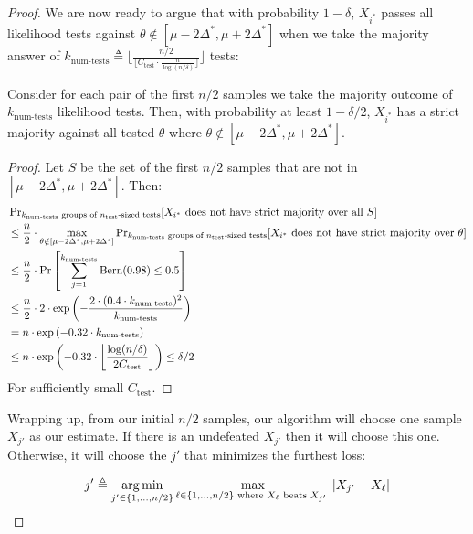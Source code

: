 \begin{proof}
We are now ready to argue that with probability $1-\delta$, $X_{i^*}$ passes all likelihood tests against $\theta \notin [\mu-2\Delta^*,\mu+2\Delta^*]$ when we take the majority answer of $k_{\textrm{num-tests}} \triangleq \lfloor \frac{n/2}{\lfloor C_{\textrm{test}} \cdot \frac{n}{\log(n/\delta)} \rfloor} \rfloor$ tests:

\begin{claim}\label{claim:majority-good}
    Consider for each pair of the first $n/2$ samples we take the majority outcome of $k_{\textrm{num-tests}}$ likelihood tests. Then, with probability at least $1-\delta/2$, $X_{i^*}$ has a strict majority against all tested $\theta$ where $\theta \notin [\mu - 2 \Delta^*, \mu + 2 \Delta^*]$. 
\end{claim}
\begin{proof}
    Let $S$ be the set of the first $n/2$ samples that are not in $[\mu - 2 \Delta^*, \mu + 2\Delta^*]$. Then:
    \begin{align*}
        & \operatorname{{Pr}}_{\textrm{$k_{\textrm{num-tests}}$ groups of $n_{\textrm{test}}$-sized tests}}[X_{i^*} \textrm{ does not have strict majority over all } S] \\
        & \le \frac{n}{2} \cdot \max_{\theta \notin [\mu-2\Delta^*, \mu + 2 \Delta^*]}\operatorname{{Pr}}_{\textrm{$k_{\textrm{num-tests}}$ groups of $n_{\textrm{test}}$-sized tests}}[X_{i^*} \textrm{ does not have strict majority over } \theta] \\
        & \le \frac{n}{2} \cdot \operatorname{{Pr}}\left[\sum_{j=1}^{k_{\textrm{num-tests}}} \operatorname{Bern}(0.98) \le 0.5\right]\\
        & \le \frac{n}{2} \cdot 2 \cdot \exp\left( - \frac{2 \cdot (0.4 \cdot k_{\textrm{num-tests}})^2}{k_{\textrm{num-tests}}} \right) \\
        & = n \cdot \exp\left( - 0.32 \cdot k_{\textrm{num-tests}} \right)\\
        & \le n \cdot \exp\left( - 0.32 \cdot \left\lfloor \frac{\log(n/\delta)}{2 C_{\textrm{test}}} \right\rfloor \right) \le \delta/2
    \end{align*}
    For sufficiently small $C_{\textrm{test}}$.
\end{proof}

Wrapping up, from our initial $n/2$ samples, our algorithm will choose one sample $X_{j'}$ as our estimate. If there is an undefeated $X_{j'}$ then it will choose this one. Otherwise, it will choose the $j'$ that minimizes the furthest loss:

\begin{equation}
    j' \triangleq \operatorname*{arg\,min}_{j' \in \{1,\dots, n/2\}} \max_{\ell \in \{1,\dots, n/2\} \textrm{ where $X_\ell$ beats $X_{j'}$ }} |X_{j'} - X_\ell| \label{eq:jprime}
\end{equation}


\end{proof}
